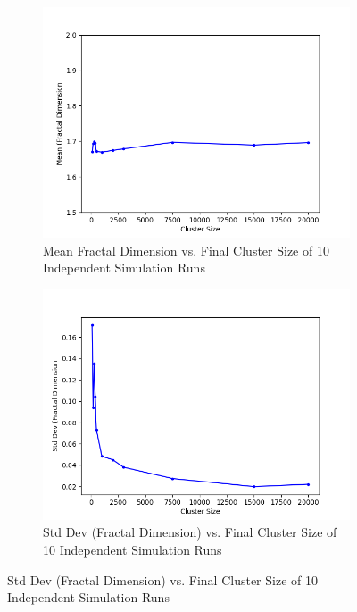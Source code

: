 \documentclass[aps,preprint,groupedaddress,letterpaper]{revtex4-1}
\begin{document}
\begin{figure}[h]
     \centering
     \begin{subfigure}[h]{0.45\textwidth}
         \centering
         \includegraphics[width=\textwidth]{img/PNum/std.png}
         \caption{Mean Fractal Dimension vs. Final Cluster Size of 10 Independent Simulation Runs}
         \label{dfcsm}
     \end{subfigure}
     \hfill
     \begin{subfigure}[h]{0.45\textwidth}
         \centering
         \includegraphics[width=\textwidth]{img/PNum/mean.png}
         \caption{Std Dev (Fractal Dimension) vs. Final Cluster Size of 10 Independent Simulation Runs}
         \label{dfcsstd}
     \end{subfigure}
\end{figure}
\end{document}
